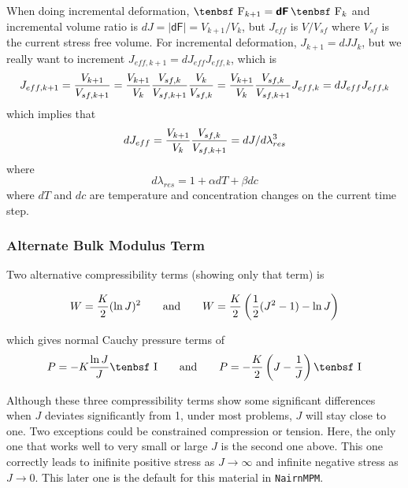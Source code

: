 \documentclass[11pt]{article}
\newcommand{\tens}[1]{\boldsymbol{\mathsf{#1}}}
\def\F{\hbox{\tenbsf F}}
\def\I{\hbox{\tenbsf I}}
\begin{document}
When doing incremental deformation, $\F_{k+1} = \tens{dF}\thinspace\F_k$ and incremental volume ratio is $dJ = |\tens{dF}| = V_{k+1}/ V_k$, but $J_{eff}$ is $V/V_{sf}$ where $V_{sf}$ is the current stress free volume. For incremental deformation, $J_{k+1} = dJ J_k$, but we really want to increment $J_{eff,k+1} = dJ_{eff}J_{eff,k}$, which is\begin{equation}
     J_{eff,k+1} = {V_{k+1}\over V_{sf,k+1}} = {V_{k+1}\over V_{k}}{V_{sf,k}\over V_{sf,k+1}} {V_{k}\over V_{sf,k}}
             = {V_{k+1}\over V_{k}}{V_{sf,k}\over V_{sf,k+1}} J_{eff,k} = dJ_{eff}J_{eff,k}
\end{equation}
which implies that
\begin{equation}
      dJ_{eff} = {V_{k+1}\over V_{k}}{V_{sf,k}\over V_{sf,k+1}} = dJ/d\lambda_{res}^3
\end{equation}
where
\begin{equation}
    d\lambda_{res} = 1 + \alpha dT + \beta dc
\end{equation}
where $dT$ and $dc$ are temperature and concentration changes on the current time step.

\subsubsection{Alternate Bulk Modulus Term}

Two alternative compressibility terms (showing only that term) is

\begin{equation}
W = {K\over2}(\ln J)^2  \qquad{\rm and}\qquad W = {K\over2}\left({1\over2}(J^2-1) - \ln J\right)
\end{equation}

\noindent which gives normal Cauchy pressure terms of
\begin{equation}
     P = -K {\ln J\over J}\I  \qquad{\rm and}\qquad P = - {K\over 2}\left(J-{1\over J}\right)\I
\end{equation}

\noindent Although these three compressibility terms show some significant differences when $J$ deviates significantly from 1, under most problems, $J$ will stay close to one. Two exceptions could be constrained compression or tension. Here, the only one that works well to very small or large $J$ is the second one above. This one correctly leads to inifinite positive stress as $J\to\infty$ and infinite negative stress as $J\to0$. This later one is the default for this material in {\tt NairnMPM}.
\end{document}
